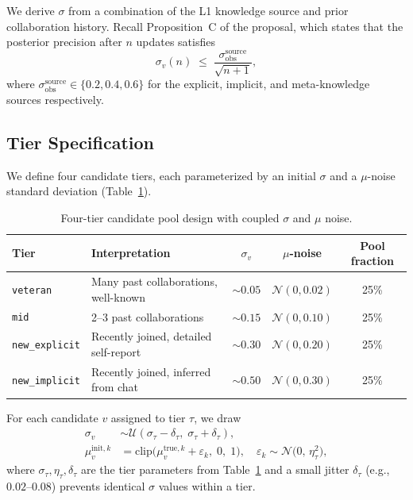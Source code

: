 \documentclass[11pt]{article}
\begin{document}
We derive $\sigma$ from a combination of the L1 knowledge source and prior
collaboration history. Recall Proposition~C of the proposal, which states that
the posterior precision after $n$ updates satisfies
\begin{equation}
\sigma_v(n) \;\leq\; \frac{\sigma_{\text{obs}}^{\text{source}}}{\sqrt{n + 1}},
\end{equation}
where $\sigma_{\text{obs}}^{\text{source}} \in \{0.2, 0.4, 0.6\}$ for the
explicit, implicit, and meta-knowledge sources respectively.

\subsection{Tier Specification}

We define four candidate tiers, each parameterized by an initial $\sigma$ and a
$\mu$-noise standard deviation (Table~\ref{tab:tiers}).

\begin{table}[h]
\centering
\small
\begin{tabular}{llccc}
\toprule
Tier & Interpretation & $\sigma_v$ & $\mu$-noise & Pool fraction \\
\midrule
\texttt{veteran}      & Many past collaborations, well-known   & $\sim 0.05$ & $\mathcal{N}(0, 0.02)$ & 25\% \\
\texttt{mid}          & 2--3 past collaborations               & $\sim 0.15$ & $\mathcal{N}(0, 0.10)$ & 25\% \\
\texttt{new\_explicit} & Recently joined, detailed self-report & $\sim 0.30$ & $\mathcal{N}(0, 0.20)$ & 25\% \\
\texttt{new\_implicit} & Recently joined, inferred from chat   & $\sim 0.50$ & $\mathcal{N}(0, 0.30)$ & 25\% \\
\bottomrule
\end{tabular}
\caption{Four-tier candidate pool design with coupled $\sigma$ and $\mu$ noise.}
\label{tab:tiers}
\end{table}

For each candidate $v$ assigned to tier $\tau$, we draw
\begin{align}
\sigma_v &\sim \mathcal{U}(\sigma_\tau - \delta_\tau, \;\sigma_\tau + \delta_\tau), \\
\mu_v^{\text{init},k} &= \mathrm{clip}\bigl(\mu_v^{\text{true},k} + \varepsilon_k,\;0,\;1\bigr),
\quad \varepsilon_k \sim \mathcal{N}\bigl(0, \,\eta_\tau^2\bigr),
\end{align}
where $\sigma_\tau, \eta_\tau, \delta_\tau$ are the tier parameters from
Table~\ref{tab:tiers} and a small jitter $\delta_\tau$ (e.g., $0.02$--$0.08$)
prevents identical $\sigma$ values within a tier.
\end{document}
